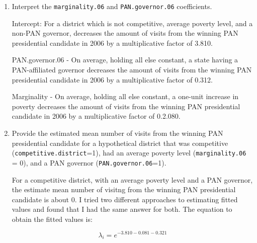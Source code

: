 \documentclass[12pt,letterpaper]{article}
\begin{document}
\begin{enumerate}
	
	
	\item [(b)]
	Interpret the \texttt{marginality.06} and \texttt{PAN.governor.06} coefficients.
	
	Intercept: For a district which is not competitive, average poverty level, and a non-PAN governor, decreases the amount of visits from the winning PAN presidential candidate in 2006 by a multiplicative factor of 3.810.
	
	PAN.governor.06 - On average, holding all else constant, a state having a PAN-affiliated governor decreases the amount of visits from the winning PAN presidential candidate in 2006 by a multiplicative factor of 0.312. 

Marginality - On average, holding all else constant, a one-unit increase in poverty decreases the amount of visits from the winning PAN presidential candidate in 2006 by a multiplicative factor of 0.2.080. 


		
	\vspace{0.5cm}
	\item [(c)]
	Provide the estimated mean number of visits from the winning PAN presidential candidate for a hypothetical district that was competitive (\texttt{competitive.district}=1), had an average poverty level (\texttt{marginality.06} = 0), and a PAN governor (\texttt{PAN.governor.06}=1).
	
	For a competitive district, with an average poverty level and a PAN governor, the estimate mean number of visitng from the winning PAN presidential candidate is about 0. 
I tried two different approaches to estimating fitted values and found that I had the same answer for both. The equation to obtain the fitted values is:

\[
\lambda_i = e^{-3.810 - 0.081 - 0.321}
\]


		
\end{enumerate}
\end{document}
